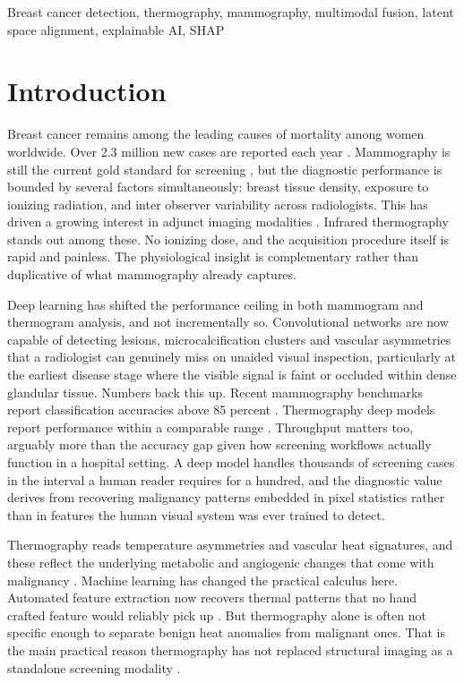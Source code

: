 \documentclass[lettersize,journal]{IEEEtran}
\begin{document}
\begin{IEEEkeywords}
Breast cancer detection, thermography, mammography, multimodal fusion, latent space alignment, explainable AI, SHAP
\end{IEEEkeywords}

\section{Introduction}
Breast cancer remains among the leading causes of mortality among women worldwide. Over 2.3 million new cases are reported each year \cite{sung2021global}. Mammography is still the current gold standard for screening \cite{michell2018role, yala2022deep}, but the diagnostic performance is bounded by several factors simultaneously: breast tissue density, exposure to ionizing radiation, and inter observer variability across radiologists. This has driven a growing interest in adjunct imaging modalities \cite{ng2022review, arora2008effectiveness}. Infrared thermography stands out among these. No ionizing dose, and the acquisition procedure itself is rapid and painless. The physiological insight is complementary rather than duplicative of what mammography already captures.

Deep learning has shifted the performance ceiling in both mammogram and thermogram analysis, and not incrementally so. Convolutional networks are now capable of detecting lesions, microcalcification clusters and vascular asymmetries that a radiologist can genuinely miss on unaided visual inspection, particularly at the earliest disease stage where the visible signal is faint or occluded within dense glandular tissue. Numbers back this up. Recent mammography benchmarks report classification accuracies above 85 percent \cite{Shen2019DeepLearningMammo, Ragab2019CBISDDSM, AlMnayyis2025}. Thermography deep models report performance within a comparable range \cite{pereira2020infrared, Roslidar2020, Alzahrani2025}. Throughput matters too, arguably more than the accuracy gap given how screening workflows actually function in a hospital setting. A deep model handles thousands of screening cases in the interval a human reader requires for a hundred, and the diagnostic value derives from recovering malignancy patterns embedded in pixel statistics rather than in features the human visual system was ever trained to detect.

Thermography reads temperature asymmetries and vascular heat signatures, and these reflect the underlying metabolic and angiogenic changes that come with malignancy \cite{head1979infrared, ng2009breast}. Machine learning has changed the practical calculus here. Automated feature extraction now recovers thermal patterns that no hand crafted feature would reliably pick up \cite{pereira2020infrared, el2021machine}. But thermography alone is often not specific enough to separate benign heat anomalies from malignant ones. That is the main practical reason thermography has not replaced structural imaging as a standalone screening modality \cite{vishnu2023review}.
\end{document}

